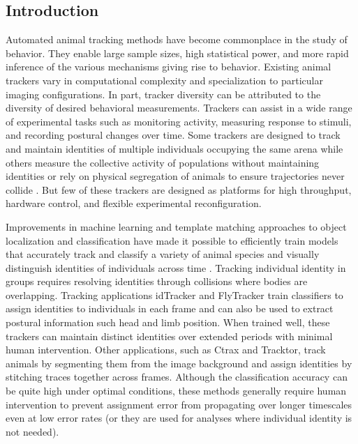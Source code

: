 \documentclass[10pt]{article}
\begin{document}
\vspace{1cm}
\begin{multicols}{2}
\section*{Introduction}

Automated animal tracking methods have become commonplace in the study of behavior. They enable large sample sizes, high statistical power, and more rapid inference of the various mechanisms giving rise to behavior. Existing animal trackers vary in computational complexity and specialization to particular imaging configurations. In part, tracker diversity can be attributed to the diversity of desired behavioral measurements. Trackers can assist in a wide range of experimental tasks such as monitoring activity, measuring response to stimuli\cite{Fry_TrackFly_2008,Donelson_High_2012}, and recording postural changes over time\cite{Mathis_DeepLabCut_2018,Pereira_Fast_2018}. Some trackers are designed to track and maintain identities of multiple individuals occupying the same arena \cite{Prez-Escudero_idTracker_2014,Eyjolfsdottir_Detecting_2014,Rodriguez_ToxId_2017} while others measure the collective activity of populations without maintaining identities or rely on physical segregation of animals to ensure trajectories never collide \cite{Ramot_The_2008,Swierczek_High_2011,Itskovits_A_2017}. But few of these trackers are designed as platforms for high throughput, hardware control, and flexible experimental reconfiguration. 

Improvements in machine learning and template matching approaches to object localization and classification have made it possible to efficiently train models that accurately track and classify a variety of animal species and visually distinguish identities of individuals across time \cite{Eyjolfsdottir_Detecting_2014,Prez-Escudero_idTracker_2014}. Tracking individual identity in groups requires resolving identities through collisions where bodies are overlapping. Tracking applications idTracker and FlyTracker train classifiers to assign identities to individuals in each frame and can also be used to extract postural information such head and limb position. When trained well, these trackers can maintain distinct identities over extended periods with minimal human intervention. Other applications, such as Ctrax and Tracktor\cite{Branson_High_2009,Rodriguez_ToxId_2017,Sridhar_Tracktor_2018}, track animals by segmenting them from the image background and assign identities by stitching traces together across frames. Although the classification accuracy can be quite high under optimal conditions, these methods generally require human intervention to prevent assignment error from propagating over longer timescales even at low error rates (or they are used for analyses where individual identity is not needed). 


\end{multicols}
\end{document}
